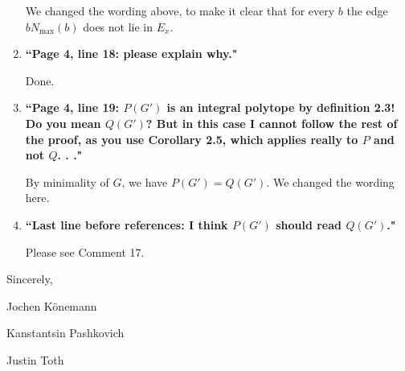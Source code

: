 \documentclass[11pt]{article}
\begin{document}
\begin{enumerate}
	\smallskip
	
	We changed the wording above, to make it clear that for every $b$ the edge $b N_{\max}(b)$ does not lie in $E_x$.
	
	\bigskip
	
	\item \textbf{``Page 4, line 18: please explain why."}
	
	\smallskip
	
	Done.
	
	\bigskip
	
		\item \textbf{``Page 4, line 19: $P(G')$ is an integral polytope by definition 2.3! Do you mean $Q(G')$? But in this case I cannot follow the rest of the proof, as you use Corollary 2.5, which applies really to $P$ and not $Q$. . ."}
	
	\smallskip
	
	By minimality of $G$, we have $P(G')=Q(G')$. We changed the wording here.
	
	\bigskip
	
	\item \textbf{``Last line before references: I think $P(G')$ should read $Q(G')$."}
	
	Please see Comment 17.

	
\end{enumerate}

 Sincerely,

\smallskip

\qquad Jochen K\"{o}nemann

\qquad  Kanstantsin Pashkovich

\qquad  Justin Toth
\end{document}

